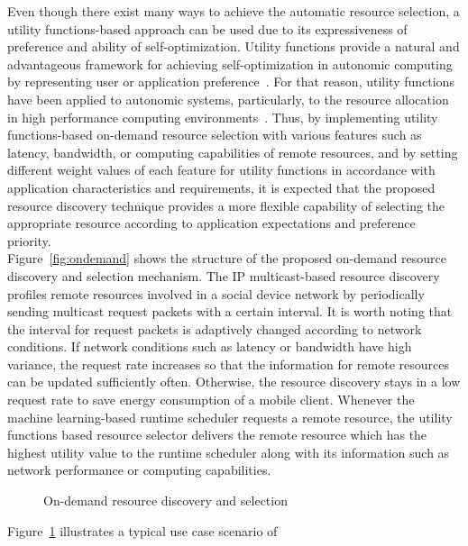 %
Even though there exist many ways to achieve the automatic
resource selection, a utility functions-based approach can be used due to
its expressiveness of preference and ability of self-optimization.
%
Utility functions provide a natural and advantageous framework for
achieving self-optimization in autonomic computing by representing user
or application preference~\cite{utility}.
%
For that reason, utility functions have been applied to autonomic systems,
particularly, to the resource allocation in high performance computing
environments~\cite{william, david, terence, paul}.
%
Thus, by implementing utility functions-based on-demand resource
selection with various features such as latency, bandwidth, or computing
capabilities of remote resources, and by setting different weight values
of each feature for utility functions in accordance with application
characteristics and requirements, it is expected that the proposed
resource discovery technique provides a more flexible capability of
selecting the appropriate resource according to application expectations
and preference priority.\\
%
Figure~\ref{fig:ondemand} shows the structure of the proposed on-demand 
resource discovery and selection mechanism. 
%
The IP multicast-based resource discovery profiles remote
resources involved in a social device network by periodically sending
multicast request packets with a certain interval.
%
It is worth noting that the interval for request packets is adaptively
changed according to network conditions.
%
If network conditions such as latency or bandwidth have high variance,
the request rate increases so that the information for remote resources 
can be updated sufficiently often.
%
%
Otherwise, the resource discovery stays in a low request rate to save
energy consumption of a mobile client. 
%
Whenever the machine learning-based runtime scheduler requests a remote
resource, the utility functions based resource selector delivers the
remote resource which has the highest utility value to the runtime
scheduler along with its information such as network performance or
computing capabilities.\\
%
\begin{figure}
\centering
{}
\caption{On-demand resource discovery and selection}
\label{fig:futurework}
\end{figure}
%
Figure~\ref{fig:futurework} illustrates a typical use case scenario of
